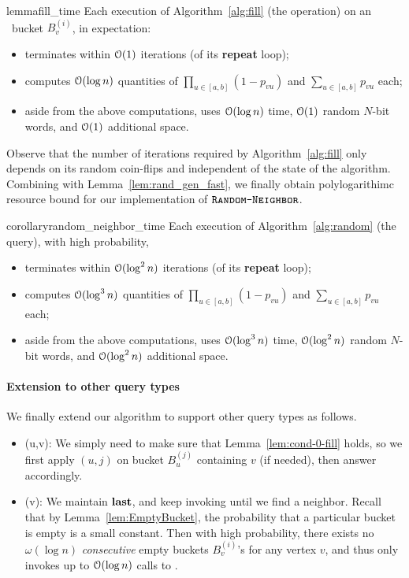 \begin{restatable}{lemma}{fill_time}
\label{lem:fill_time}
Each execution of Algorithm~\ref{alg:fill} (the  operation) on an \unfilled~bucket $B^{(i)}_v$, in expectation:
\begin{itemize}
\item terminates within $\mathcal{O}(1)$ iterations (of its \textup{\textbf{repeat}} loop);
\item computes $\mathcal{O}(\log n)$ quantities of $\prod_{u \in [a,b]} (1-p_{vu})$ and $\sum_{u\in[a,b]} p_{vu}$ each;
\item aside from the above computations, uses $\mathcal{O}(\log n)$ time, $\mathcal{O}(1)$ random $N$-bit words, and $\mathcal{O}(1)$ additional space.
\end{itemize}
\end{restatable}

Observe that the number of iterations required by Algorithm~\ref{alg:fill} only depends on its random coin-flips and independent of the state of the algorithm.
Combining with Lemma~\ref{lem:rand_gen_fast}, we finally obtain polylogarithimc resource bound for our implementation of $\texttt{\textsc{Random-Neighbor}}$.

\begin{restatable}{corollary}{random_neighbor_time}
\label{cor:random_neighbor_time}
Each execution of Algorithm~\ref{alg:random} (the  query), with high probability,
\begin{itemize}
\item terminates within $\mathcal{O}(\log^2 n)$ iterations (of its \textup{\textbf{repeat}} loop);
\item computes $\mathcal{O}(\log^3 n)$ quantities of $\prod_{u \in [a,b]} (1-p_{vu})$ and $\sum_{u\in[a,b]} p_{vu}$ each;
\item aside from the above computations, uses $\mathcal{O}(\log^3 n)$ time, $\mathcal{O}(\log^2 n)$ random $N$-bit words, and $\mathcal{O}(\log^2 n)$ additional space.
\end{itemize}
\end{restatable}

\paragraph*{Extension to other query types}
We finally extend our algorithm to support other query types as follows.
\begin{itemize}
\item {}(u,v): We simply need to make sure that Lemma~\ref{lem:cond-0-fill} holds, so we first apply $(u,j)$ on bucket $B_u^{(j)}$ containing $v$ (if needed), then answer accordingly.
\item {}(v): We maintain $\mathbf{last}$, and keep invoking  until we find a neighbor. Recall that by Lemma~\ref{lem:EmptyBucket}, the probability that a particular bucket is empty is a small constant. Then with high probability, there exists no $\omega(\log n)$ \emph{consecutive} empty buckets $B^{(i)}_v$'s for any vertex $v$, and thus  only invokes up to $\mathcal{O}(\log n)$ calls to .
\end{itemize}

